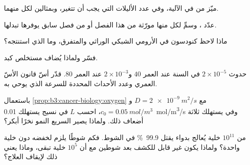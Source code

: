 \begin{exercise}[$\star$]\label{exo:b3:cancer-biology:1}
ميّز  من  في الآلية،
وفي عدد الأليلات التي يجب أن تتغير، وبمثالين لكل منهما.
\end{exercise}

\begin{exercise}[$\star$]\label{exo:b3:cancer-biology:2}
عدّد ، وسمِّ لكل منها مورّثة من هذا الفصل أو من
فصل سابق يوفرها تبدلها.
\end{exercise}

\begin{exercise}[$\star$]\label{exo:b3:cancer-biology:3}
ماذا لاحظ كنودسون في  الأرومي الشبكي الوراثي والمتفرق،
وما الذي استنتجه؟
\end{exercise}

\begin{exercise}[$\star$]\label{exo:b3:cancer-biology:4}
فسّر  ولماذا يُضاف مستخلص كبد.
\end{exercise}

\begin{exercise}[$\star\star$]\label{exo:b3:cancer-biology:5}
حدوث  $2\times 10^{-5}$ في السنة عند العمر $40$
و$2\times 10^{-3}$ عند العمر $80$. قدّر أسّ
قانون الأسّ العمري وعدد الأحداث المحددة للسرعة الذي يوحي به.
\end{exercise}

\begin{exercise}[$\star\star$]\label{exo:b3:cancer-biology:6}
باستعمال \cref{prop:b3:cancer-biology:oxygen} مع $D =
\qty{2e-9}{m^2/s}$ و$c_{0} = \qty{0.05}{mol/m^3}$، احسب $L$ في
نسيج يستهلك \qty{0.01}{mol/m^3/s} وفي  يستهلك ثلاثة
أضعاف ذلك. ولماذا يصير  السريع النمو نخرًا أبكر؟
\end{exercise}

\begin{exercise}[$\star\star$]\label{exo:b3:cancer-biology:7}
 من $10^{11}$ خلية يُعالج بدواء يقتل
\qty{99.9}{\%} في الشوط. فكم شوطًا يلزم لخفضه دون خلية
واحدة؟ ولماذا يكون  غير قابل للكشف بعد شوطين مع أن
$10^{5}$ خلية تبقى، وماذا يعني ذلك لإيقاف العلاج؟
\end{exercise}


